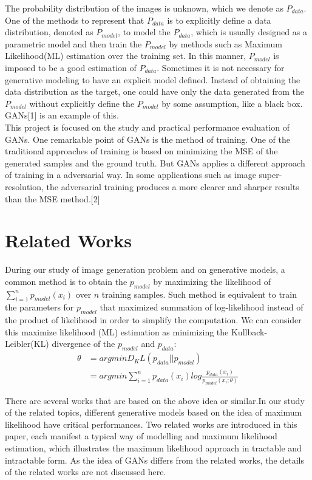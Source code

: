 \documentclass[10pt,twocolumn,letterpaper]{article}
\begin{document}
The probability distribution of the images is unknown, which we denote as $P_{data}$. One of the methods to represent that $P_{data}$ is to explicitly define a data distribution, denoted as $P_{model}$, to model the $P_{data}$, which is usually designed as a parametric model and then train the $P_{model}$ by methods such as Maximum Likelihood(ML) estimation over the training set. In this manner, $P_{model}$ is imposed to be a good estimation of $P_{data}$. Sometimes it is not necessary for generative modeling to have an explicit model defined. Instead of obtaining the data distribution as the target, one could have only the data generated from the $P_{model}$ without explicitly define the $P_{model}$ by some assumption, like a black box. GANs[1] is an example of this.\\

This project is focused on the study and practical performance evaluation of GANs. One remarkable point of GANs is the method of training. One of the traditional approaches of training is based on minimizing the MSE of the generated samples and the ground truth. But GANs applies a different approach of training in a adversarial way. In some applications such as image super-resolution, the adversarial training produces a more clearer and sharper results than the MSE method.[2]

\section{Related Works}

During our study of image generation problem and on generative models, a common method is to obtain the $p_{model}$ by maximizing the likelihood of $\sum_{i=1}^{n}p_{model}(x_i)$ over $n$ training samples. Such method is equivalent to train the parameters for $p_{model}$ that maximized summation of log-likelihood instead of the product of likelihood in order to simplify the computation. We can consider this  maximize likelihood (ML) estimation as minimizing the Kullback-Leibler(KL) divergence of the $p_{model}$ and $p_{data}$:
\begin{align}
\theta &= argminD_KL(p_{data}||p_{model})\nonumber \\
&= argmin\sum_{i=1}^{n}p_{data}(x_i)log\frac{p_{data}(x_i)}{p_{model}(x_i;\theta)}
\end{align}

There are several works that are based on the above idea or similar.In our study of the related topics, different generative models based on the idea of maximum likelihood have critical performances. Two related works are introduced in this paper, each manifest a typical way of modelling and maximum likelihood estimation, which illustrates the maximum likelihood approach in tractable and intractable form. As the idea of GANs differs from the related works, the details of the related works are not discussed here.
\end{document}
